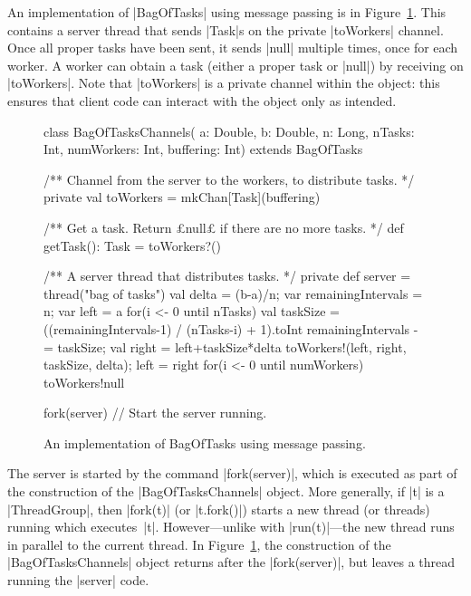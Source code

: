 
An implementation of |BagOfTasks| using message passing is in
Figure~\ref{fig:bagOfTasksObject}.  This contains a server thread that sends
|Task|s on the private |toWorkers| channel.  Once all proper tasks have been
sent, it sends |null| multiple times, once for each worker.  A worker can
obtain a task (either a proper task or |null|) by receiving on |toWorkers|.
Note that |toWorkers| is a private channel within the object: this ensures
that client code can interact with the object only as intended.


\begin{figure}
\begin{scala}
class BagOfTasksChannels(
  a: Double, b: Double, n: Long, nTasks: Int, numWorkers: Int, buffering: Int)
    extends BagOfTasks{
  /** Channel from the server to the workers, to distribute tasks. */
  private val toWorkers = mkChan[Task](buffering)

  /** Get a task.  Return £null£ if there are no more tasks. */
  def getTask(): Task = toWorkers?() 

  /** A server thread that distributes tasks. */
  private def server = thread("bag of tasks"){
    val delta = (b-a)/n; var remainingIntervals = n; var left = a
    for(i <- 0 until nTasks){
      val taskSize = ((remainingIntervals-1) / (nTasks-i) + 1).toInt
      remainingIntervals -= taskSize; val right = left+taskSize*delta
      toWorkers!(left, right, taskSize, delta); left = right
    }
    for(i <- 0 until numWorkers) toWorkers!null
  }

  fork(server)  // Start the server running.
}
\end{scala}
\caption{An implementation of {\scalastyle BagOfTasks} using message passing.}
\label{fig:bagOfTasksObject}
\end{figure}


The server is started by the command |fork(server)|, which is executed as part
of the construction of the |BagOfTasksChannels| object.
%
More generally, if |t| is a |ThreadGroup|, then |fork(t)| (or
|t.fork()|) starts a new thread (or threads) running which executes~|t|.
However---unlike with |run(t)|---the new thread runs in parallel to the
current thread.  In Figure~\ref{fig:bagOfTasksObject}, the construction of the
|BagOfTasksChannels| object returns after the |fork(server)|, but leaves a
thread running the |server| code.

